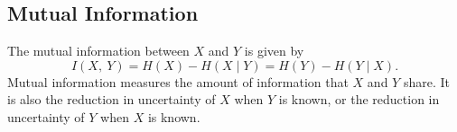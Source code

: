 \documentclass{article}
\begin{document}
\subsection{Mutual Information}
The mutual information between \(X\) and \(Y\) is given by
\begin{equation*}
    I\left( X,\: Y \right) = H\left( X \right) - H\left( X \mid Y \right) = H\left( Y \right) - H\left( Y \mid X \right).
\end{equation*}
Mutual information measures the amount of information that \(X\) and
\(Y\) share. It is also the reduction in uncertainty of \(X\) when \(Y\)
is known, or the reduction in uncertainty of \(Y\) when \(X\) is known.
\end{document}

